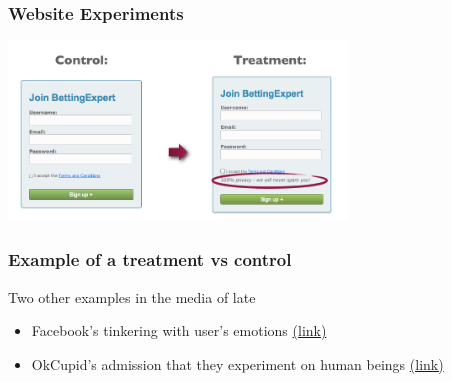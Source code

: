 \documentclass[slides]{beamer}
\newcommand{\blue}[1]{\textcolor{blue2}{#1}}
\begin{document}
\begin{frame}
\frametitle{Website Experiments}
\begin{center}
\includegraphics[width=9cm]{figure/control_treatment.png}
\end{center}
\end{frame}



\begin{frame}
\frametitle{Example of a treatment vs control}
Two other examples in the media of late
\begin{itemize}
\item Facebook's tinkering with user's emotions \blue{\href{http://www.nytimes.com/2014/06/30/technology/facebook-tinkers-with-users-emotions-in-news-feed-experiment-stirring-outcry.html}{(link)}}
\item OkCupid's admission that they experiment on human beings \blue{\href{http://blog.okcupid.com/index.php/we-experiment-on-human-beings/}{(link)}}
\end{itemize}

\end{frame}
\end{document}
